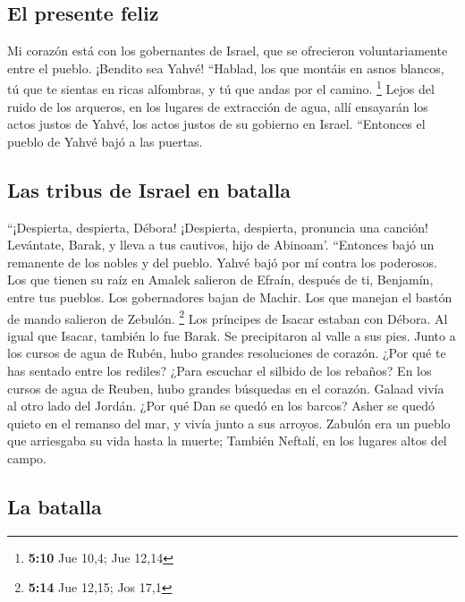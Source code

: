 \begin{paracol}{2}
\hypertarget{el-presente-feliz}{%
\subsection{El presente feliz}\label{el-presente-feliz}}

 Mi corazón está con los gobernantes de Israel, que se
ofrecieron voluntariamente entre el pueblo. ¡Bendito sea Yahvé!
 ``Hablad, los que montáis en asnos blancos, tú que te
sientas en ricas alfombras, y tú que andas por el camino. \footnote{\textbf{5:10}
  Jue 10,4; Jue 12,14}  Lejos del ruido de los arqueros,
en los lugares de extracción de agua, allí ensayarán los actos justos de
Yahvé, los actos justos de su gobierno en Israel. ``Entonces el pueblo
de Yahvé bajó a las puertas.

\hypertarget{las-tribus-de-israel-en-batalla}{%
\subsection{Las tribus de Israel en
batalla}\label{las-tribus-de-israel-en-batalla}}

 ``¡Despierta, despierta, Débora! ¡Despierta, despierta,
pronuncia una canción! Levántate, Barak, y lleva a tus cautivos, hijo de
Abinoam'.  ``Entonces bajó un remanente de los nobles y
del pueblo. Yahvé bajó por mí contra los poderosos.  Los
que tienen su raíz en Amalek salieron de Efraín, después de ti,
Benjamín, entre tus pueblos. Los gobernadores bajan de Machir. Los que
manejan el bastón de mando salieron de Zebulón. \footnote{\textbf{5:14}
  Jue 12,15; Jos 17,1}  Los príncipes de Isacar estaban
con Débora. Al igual que Isacar, también lo fue Barak. Se precipitaron
al valle a sus pies. Junto a los cursos de agua de Rubén, hubo grandes
resoluciones de corazón.  ¿Por qué te has sentado entre
los rediles? ¿Para escuchar el silbido de los rebaños? En los cursos de
agua de Reuben, hubo grandes búsquedas en el corazón. 
Galaad vivía al otro lado del Jordán. ¿Por qué Dan se quedó en los
barcos? Asher se quedó quieto en el remanso del mar, y vivía junto a sus
arroyos.  Zabulón era un pueblo que arriesgaba su vida
hasta la muerte; También Neftalí, en los lugares altos del campo.

\hypertarget{la-batalla}{%
\subsection{La batalla}\label{la-batalla}}


\end{paracol}
